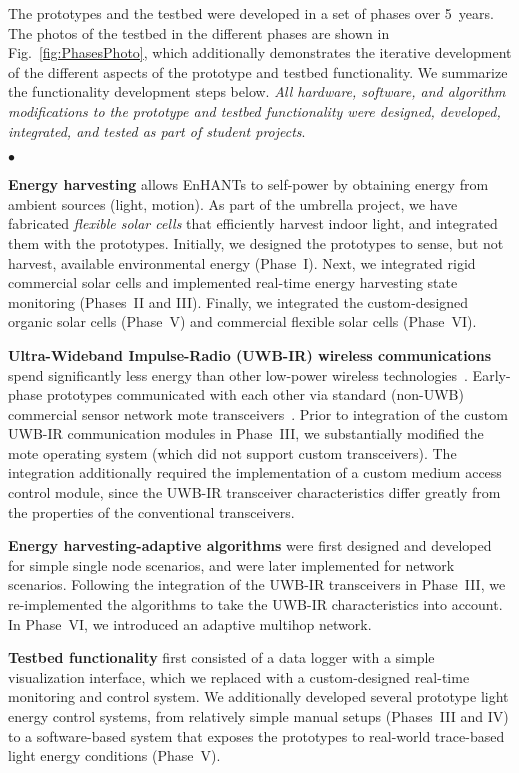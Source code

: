 \documentclass[journal,twopages]{IEEEtran}
\newenvironment{myitemize}{\begin{list}{$\bullet$}{\renewcommand{\leftmargin}{0.2in}}}{\end{list}}
\begin{document}
The prototypes and the testbed were developed in a set of phases over 5~years. The photos of the testbed in the different phases are shown in Fig.~\ref{fig:PhasesPhoto}, which additionally demonstrates the iterative development of the different aspects of the prototype and testbed functionality. We summarize the functionality development steps below. \emph{All hardware, software, and algorithm modifications to the prototype and testbed functionality
were designed, developed, integrated, and tested as part of student projects}. \begin{myitemize}
\item \textbf{Energy harvesting} allows EnHANTs to self-power by obtaining energy from ambient sources (light, motion).
    As part of the umbrella project, we have fabricated \emph{flexible solar cells} that
    efficiently harvest indoor light, and integrated them with the prototypes.
    Initially, we designed the prototypes to sense, but not harvest, available environmental energy (Phase~I).
    Next, we integrated rigid commercial solar cells and implemented real-time energy harvesting state monitoring (Phases~II and III). Finally, we integrated the custom-designed organic solar cells (Phase~V) and commercial flexible solar cells (Phase~VI). \item \textbf{Ultra-Wideband \mbox{Impulse-Radio} (\mbox{UWB-IR}) wireless communications}
    spend significantly less energy than other low-power wireless technologies~\cite{Crepaldi2011}.
    Early-phase prototypes communicated with each other via standard (\mbox{non-UWB}) commercial sensor network mote transceivers~\cite{MicaMote}. Prior to integration of the custom \mbox{UWB-IR} communication modules
    in Phase~III, we substantially modified the mote operating system (which did not support custom transceivers).
    The integration additionally required the implementation of a custom medium access control module, since the \mbox{UWB-IR} transceiver characteristics differ greatly from the properties of the conventional transceivers. \item \textbf{Energy harvesting-adaptive algorithms} were first designed and developed for simple single node scenarios, and were later implemented for network scenarios.
    Following the integration of the \mbox{UWB-IR} transceivers in Phase~III, we
     re-implemented the algorithms to take the \mbox{UWB-IR}
     characteristics into account. In Phase~VI, we introduced an adaptive multihop network.
\item \textbf{Testbed functionality} first consisted of a data logger with a simple visualization interface, which we  replaced with a custom-designed real-time monitoring and control system. We additionally developed several prototype light energy control systems,
    from relatively simple manual setups (Phases~III and IV) to a software-based system that exposes the prototypes to real-world trace-based light energy conditions (Phase~V).
\end{myitemize}
\end{document}
